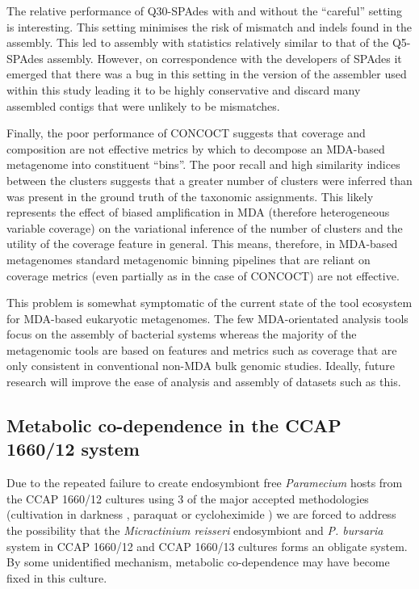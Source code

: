 The relative performance of Q30-SPAdes with and without the ``careful''
setting is interesting. This setting minimises the risk of mismatch and indels
found in the assembly.  This led to assembly with statistics relatively similar
to that of the Q5-SPAdes assembly.   However, on correspondence with the developers
of SPAdes it emerged that there was a bug in this setting in the version
of the assembler used within this study leading it to be highly conservative
and discard many assembled contigs that were unlikely to be mismatches. 


Finally, the poor performance of CONCOCT suggests that coverage and composition
are not effective metrics by which to decompose an MDA-based metagenome
into constituent ``bins''.  The poor recall and high similarity indices between
the clusters suggests that a greater number of clusters were inferred than was present
in the ground truth of the taxonomic assignments.  This likely represents the effect of
biased amplification in MDA (therefore heterogeneous variable coverage) on
the variational inference of the number of clusters and the utility of the coverage 
feature in general.  This means, therefore, in MDA-based metagenomes standard metagenomic
binning pipelines that are reliant on coverage metrics (even partially as in the case
of CONCOCT) are not effective. 

This problem is somewhat symptomatic of the current state of the tool ecosystem
for MDA-based eukaryotic metagenomes. The few MDA-orientated analysis
tools focus on the assembly of bacterial systems whereas the majority of the metagenomic
tools are based on features and metrics such as coverage that are only
consistent in conventional non-MDA bulk genomic studies. 
Ideally, future research will improve the ease of analysis and assembly
of datasets such as this.

\subsection{Metabolic co-dependence in the CCAP 1660/12 system}

Due to the repeated failure to create endosymbiont free \textit{Paramecium}
hosts from the CCAP 1660/12 cultures using 3 of the major accepted
methodologies (cultivation in darkness \citep{Karakashian1963},
paraquat \citep{Hosoya1995a,Tanaka2002} or cycloheximide \citep{weis1984effect})
we are forced to address the possibility that the \textit{Micractinium reisseri}
endosymbiont and \textit{P. bursaria} system in CCAP 1660/12 and CCAP 1660/13
cultures forms an obligate system.  By some unidentified mechanism, metabolic
co-dependence may have become fixed in this culture. 

